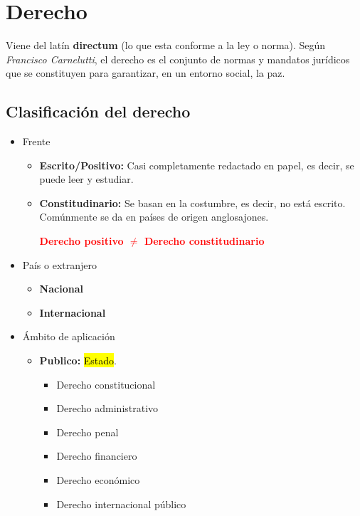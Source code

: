 \documentclass{templateNote}
\begin{document}
\newpage
\section{Derecho}

Viene del latín \textbf{directum} (lo que esta conforme a la ley o norma). Según \textit{Francisco Carnelutti}, el derecho es el conjunto de normas y mandatos jurídicos que se constituyen para garantizar, en un entorno social, la paz.


\subsection*{Clasificación del derecho}

\begin{itemize}
    \item Frente
    \begin{itemize}
        \item \textbf{Escrito/Positivo:} Casi completamente redactado en papel, es decir, se puede leer y estudiar.
        \item \textbf{Constitudinario:} Se basan en la costumbre, es decir, no está escrito. Comúnmente se da en países de origen anglosajones.
        \begin{center}
            \textcolor{red}{\textbf{Derecho positivo $\neq$ Derecho constitudinario}}    
        \end{center}
    \end{itemize}
    \item País o extranjero
    \begin{itemize}
        \item \textbf{Nacional}
        \item \textbf{Internacional}
    \end{itemize}
    \item Ámbito de aplicación
    \begin{itemize}
        \item \textbf{Publico:} \hl{Estado}.
        \begin{itemize}
            \item Derecho constitucional
            \item Derecho administrativo
            \item Derecho penal
            \item Derecho financiero
            \item Derecho económico
            \item Derecho internacional público

\end{itemize}
\end{itemize}
\end{itemize}
\end{document}
